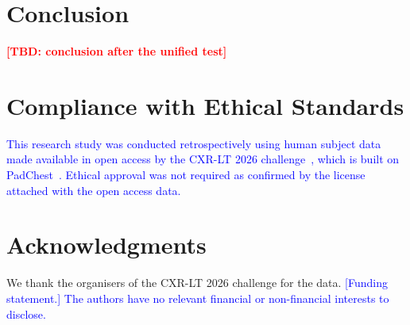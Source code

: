 \documentclass{article}
\newcommand{\TBD}[1][]{\textcolor{red}{\textbf{[TBD#1]}}}
\newcommand{\AUTHOR}[1]{\textcolor{blue}{#1}}
\begin{document}
\section{Conclusion}
\label{sec:conclusion}
\TBD[: conclusion after the unified test]
\label{end-of-technical}%

\section{Compliance with Ethical Standards}
\label{sec:ethics}
\AUTHOR{This research study was conducted retrospectively using human subject data made available in open access by the CXR-LT 2026 challenge~\cite{dong2026cxrlt}, which is built on PadChest~\cite{bustos2020padchest}. Ethical approval was not required as confirmed by the license attached with the open access data.}

\section{Acknowledgments}
\label{sec:acknowledgments}
We thank the organisers of the CXR-LT 2026 challenge for the data. \AUTHOR{[Funding statement.] The authors have no relevant financial or non-financial interests to disclose.}


{\footnotesize\setlength{\itemsep}{0pt}\setlength{\parskip}{0pt}}
\end{document}
